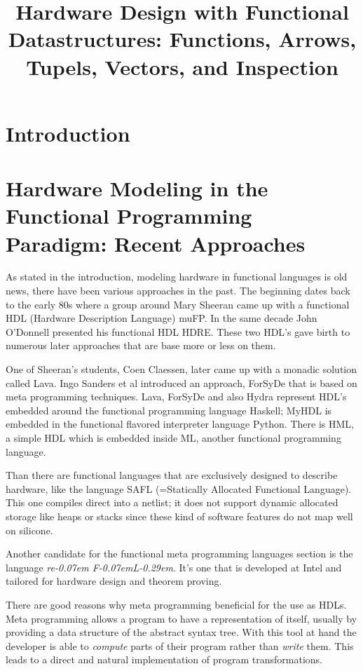 \documentclass[11pt,final,a4paper]{article}
\title{Hardware Design with Functional Datastructures: Functions, Arrows, Tupels, Vectors, and Inspection}
\newcommand{\reFLect}{\textit{re\kern-0.07em F\kern-0.07emL\kern-0.29em\raisebox{0.56ex}{ect}}}
\begin{document}
\section{Introduction}

\section{Hardware Modeling in the Functional Programming Paradigm: Recent Approaches}
\label{recent_approaches}
As stated in the introduction, modeling hardware in functional languages is old news, there have been various approaches in the
past. The beginning dates back to the early 80s where a group around Mary Sheeran came up with a functional HDL (Hardware
Description Language) muFP\cite{sheeran:muFP}. In the same decade John O'Donnell presented his functional HDL
HDRE\cite{hydra:old,donnell}. These two HDL's gave birth to numerous later approaches that are base more or less on them.

One of Sheeran's students, Coen Claessen, later came up with a monadic solution called Lava\cite{claessen:hardware}. Ingo Sanders
et al introduced an approach, ForSyDe \cite{forsyde:phd,forsyde:ieee} that is based on meta programming techniques. Lava, ForSyDe
and also Hydra %
represent HDL's embedded around the functional programming language Haskell; MyHDL \cite{myhdl} is embedded in the functional
flavored interpreter language Python. There is HML\cite{hml}, a simple HDL which is embedded inside ML, another functional
programming language.

Than there are functional languages that are exclusively designed to describe hardware, like the language SAFL (=Statically
Allocated Functional Language)\cite{sharp,sharp:flash,sharp:codesign}. This one compiles direct into a netlist; it does not
support dynamic allocated storage like heaps or stacks since these kind of software features do not map well on silicone.

Another candidate for the functional meta programming languages section is the language \reFLect \cite{reflect}. It's one that is
developed at Intel and tailored for hardware design and theorem proving.

There are good reasons why meta programming beneficial for the use as HDLs. Meta programming allows a program to have a
representation of itself, usually by providing a data structure of the abstract syntax tree. With this tool at hand the developer
is able to \emph{compute} parts of their program rather than \emph{write} them. This leads to a direct and natural implementation
of program transformations.
\end{document}
